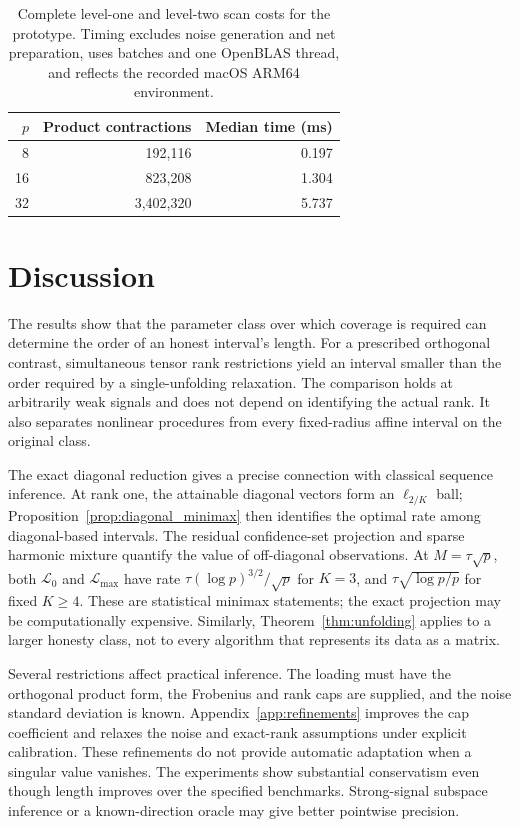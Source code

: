 \documentclass[11pt]{article}
\theoremstyle{remark}
\begin{document}
\begin{table}[ht]
\centering\small
\begin{tabular}{rrr}
\toprule
$p$ & Product contractions & Median time (ms)\\
\midrule
8 & 192,116 & 0.197 \\
16 & 823,208 & 1.304 \\
32 & 3,402,320 & 5.737 \\
\bottomrule
\end{tabular}
\caption{Complete level-one and level-two scan costs for the prototype. Timing excludes noise generation and net preparation, uses batches and one OpenBLAS thread, and reflects the recorded macOS ARM64 environment.}\label{tab:scan_runtime}
\end{table}



\section{Discussion}\label{sec:discussion}

The results show that the parameter class over which coverage is required can determine the order of an honest interval's length. For a prescribed orthogonal contrast, simultaneous tensor rank restrictions yield an interval smaller than the order required by a single-unfolding relaxation. The comparison holds at arbitrarily weak signals and does not depend on identifying the actual rank. It also separates nonlinear procedures from every fixed-radius affine interval on the original class.

The exact diagonal reduction gives a precise connection with classical sequence inference. At rank one, the attainable diagonal vectors form an $\ell_{2/K}$ ball; Proposition~\ref{prop:diagonal_minimax} then identifies the optimal rate among diagonal-based intervals. The residual confidence-set projection and sparse harmonic mixture quantify the value of off-diagonal observations. At $M=\tau\sqrt p$, both $\mathcal L_0$ and $\mathcal L_{\max}$ have rate $\tau(\log p)^{3/2}/\sqrt p$ for $K=3$, and $\tau\sqrt{\log p/p}$ for fixed $K\ge4$. These are statistical minimax statements; the exact projection may be computationally expensive. Similarly, Theorem~\ref{thm:unfolding} applies to a larger honesty class, not to every algorithm that represents its data as a matrix.

Several restrictions affect practical inference. The loading must have the orthogonal product form, the Frobenius and rank caps are supplied, and the noise standard deviation is known. Appendix~\ref{app:refinements} improves the cap coefficient and relaxes the noise and exact-rank assumptions under explicit calibration. These refinements do not provide automatic adaptation when a singular value vanishes. The experiments show substantial conservatism even though length improves over the specified benchmarks. Strong-signal subspace inference or a known-direction oracle may give better pointwise precision.
\end{document}
